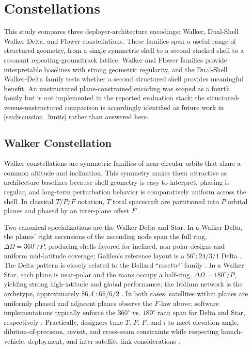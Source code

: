     \section{Constellations} \label{se:constellations}
    This study compares three deployer-architecture encodings: Walker, Dual-Shell Walker-Delta, and Flower constellations. These families span a useful range of structured geometry, from a single symmetric shell to a second stacked shell to a resonant repeating-groundtrack lattice. Walker and Flower families provide interpretable baselines with strong geometric regularity, and the Dual-Shell Walker-Delta family tests whether a second structured shell provides meaningful benefit. An unstructured plane-constrained encoding was scoped as a fourth family but is not implemented in the reported evaluation stack; the structured-versus-unstructured comparison is accordingly identified as future work in \cref{se:discussion_limits} rather than answered here.

        \subsection{Walker Constellation} \label{ss:walker}
        Walker constellations are symmetric families of near-circular orbits that share a common altitude and inclination. This symmetry makes them attractive as architecture baselines because shell geometry is easy to interpret, phasing is regular, and long-term perturbation behavior is comparatively uniform across the shell. In classical \(T/P/F\) notation, \(T\) total spacecraft are partitioned into \(P\) orbital planes and phased by an inter-plane offset \(F\) \cite{walker1970,walker1984}.

        Two canonical specializations are the Walker Delta and Star. In a Walker Delta, the planes' right ascensions of the ascending node span the full ring, \(\Delta\Omega=360^\circ/P\), producing shells favored for inclined, non-polar designs and uniform mid-latitude coverage; Galileo's reference layout is a \(56^\circ{:}24/3/1\) Delta \cite{GalileoSISICD2025}. The Delta pattern is closely related to the Ballard ``rosette'' family \cite{ballard1980}. In a Walker Star, each plane is near-polar and the \glspl{raan} occupy a half-ring, \(\Delta\Omega=180^\circ/P\), yielding strong high-latitude and global performance; the Iridium network is the archetype, approximately \(86.4^\circ{:}66/6/2\) \cite{thales_iridiumnext}. In both cases, satellites within planes are uniformly phased and adjacent planes observe the \(F\)-law above; software implementations typically enforce the \(360^\circ\) vs. \(180^\circ\) \gls{raan} span for Delta and Star, respectively \cite{matlab_walkerdelta,matlab_walkerstar}. Practically, designers tune \(T\), \(P\), \(F\), and \(i\) to meet elevation-angle, dilution-of-precision, revisit, and cross-seam constraints while respecting launch-vehicle, deployment, and inter-satellite-link considerations \cite{walker1984,vallado2013}.

